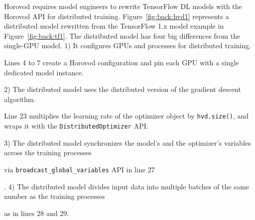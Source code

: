 Horovod requires model engineers to rewrite TensorFlow DL models with the
Horovod API for distributed training.
Figure~\ref{fig:back:hvd1} represents a distributed model rewritten from the
TensorFlow 1.x model example in Figure~\ref{fig:back:tf1}.
The distributed model has four big differences from the single-GPU model.
1) It configures GPUs and processes for distributed training.
\begin{inred}
Lines 4 to 7 create a Horovod configuration and pin each GPU with
a single dedicated model instance.
\end{inred}
2) The distributed model uses the distributed version of the gradient
descent algorithm.
\begin{inred}
Line 23 multiplies the learning rate of the optimizer object by {\tt hvd.size()},
and wraps it with the {\tt DistributedOptimizer} API.
\end{inred}
3) The distributed model synchronizes the model's and the optimizer's variables
across the training processes \begin{inred}via {\tt broadcast\_global\_variables} API 
in line 27\end{inred}.
4) The distributed model divides input data into multiple batches of the same
number as the training processes \begin{inred}as in lines 28 and 29.\end{inred}


